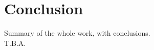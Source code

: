 \documentclass[main.tex]{subfiles}
\begin{document}
    \section{Conclusion}\label{sec:conclusion}
    Summary of the whole work, with conclusions.
    \\
    T.B.A. %
\end{document}
